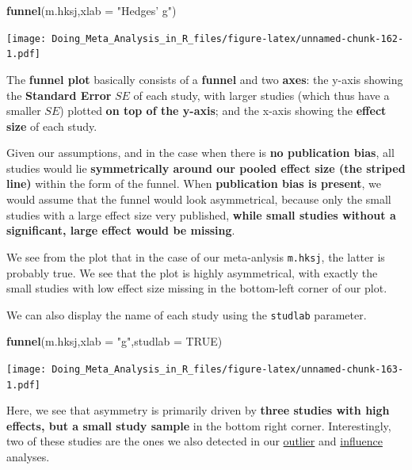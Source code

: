 \documentclass[]{book}
\newenvironment{Shaded}{\begin{snugshade}}{\end{snugshade}}
\newcommand{\DataTypeTok}[1]{\textcolor[rgb]{0.13,0.29,0.53}{#1}}
\newcommand{\KeywordTok}[1]{\textcolor[rgb]{0.13,0.29,0.53}{\textbf{#1}}}
\newcommand{\NormalTok}[1]{#1}
\newcommand{\OtherTok}[1]{\textcolor[rgb]{0.56,0.35,0.01}{#1}}
\newcommand{\StringTok}[1]{\textcolor[rgb]{0.31,0.60,0.02}{#1}}
\begin{document}
\begin{Shaded}
\begin{Highlighting}[]
\KeywordTok{funnel}\NormalTok{(m.hksj,}\DataTypeTok{xlab =} \StringTok{"Hedges' g"}\NormalTok{)}
\end{Highlighting}
\end{Shaded}

\texttt{[image: Doing\_Meta\_Analysis\_in\_R\_files/figure-latex/unnamed-chunk-162-1.pdf]}

The \textbf{funnel plot} basically consists of a \textbf{funnel} and two \textbf{axes}: the y-axis showing the \textbf{Standard Error} \(SE\) of each study, with larger studies (which thus have a smaller \(SE\)) plotted \textbf{on top of the y-axis}; and the x-axis showing the \textbf{effect size} of each study.

Given our assumptions, and in the case when there is \textbf{no publication bias}, all studies would lie \textbf{symmetrically around our pooled effect size (the striped line)} within the form of the funnel. When \textbf{publication bias is present}, we would assume that the funnel would look asymmetrical, because only the small studies with a large effect size very published, \textbf{while small studies without a significant, large effect would be missing}.

We see from the plot that in the case of our meta-anlysis \texttt{m.hksj}, the latter is probably true. We see that the plot is highly asymmetrical, with exactly the small studies with low effect size missing in the bottom-left corner of our plot.

We can also display the name of each study using the \texttt{studlab} parameter.

\begin{Shaded}
\begin{Highlighting}[]
\KeywordTok{funnel}\NormalTok{(m.hksj,}\DataTypeTok{xlab =} \StringTok{"g"}\NormalTok{,}\DataTypeTok{studlab =} \OtherTok{TRUE}\NormalTok{)}
\end{Highlighting}
\end{Shaded}

\texttt{[image: Doing\_Meta\_Analysis\_in\_R\_files/figure-latex/unnamed-chunk-163-1.pdf]}

Here, we see that asymmetry is primarily driven by \textbf{three studies with high effects, but a small study sample} in the bottom right corner. Interestingly, two of these studies are the ones we also detected in our \protect\hyperlink{outliers}{outlier} and \protect\hyperlink{influenceanalyses}{influence} analyses.
\end{document}
